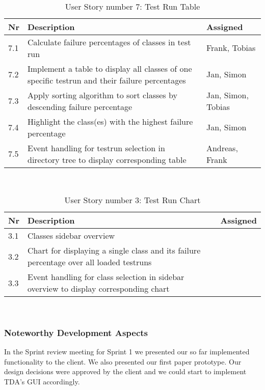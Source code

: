 \ \\ 

\begin{table}[h]
  \caption{User Story number 7: Test Run Table}
  \label{US_Table}
  \centering
  \begin{tabular}{p{1cm}|p{5cm}|p{3cm}|}
  	Nr & Description & Assigned \\ 
  	\hline
  	7.1 & Calculate failure percentages of classes in test run & Frank, Tobias \\ 
  	\hline
  	7.2 & Implement a table to display all classes of one specific testrun and their failure percentages & Jan, Simon \\ 
  	\hline
  	7.3 & Apply sorting algorithm to sort classes by descending failure percentage & Jan, Simon, Tobias \\
  	\hline
  	7.4 & Highlight the class(es) with the highest failure percentage & Jan, Simon \\
  	\hline
  	7.5 & Event handling for testrun selection in directory tree to display corresponding table & Andreas, Frank \\ 
  	\hline
  \end{tabular}
\end{table} 

\ \\ 

\begin{table}[h]
  \caption{User Story number 3: Test Run Chart}
  \label{US_Chart}
  \centering
  \begin{tabular}{p{1cm}|p{5cm}|p{3cm}|}
  	Nr & Description & Assigned \\ 
  	\hline
  	3.1 & Classes sidebar overview &  \\ 
  	\hline
  	3.2 & Chart for displaying a single class and its failure percentage over all loaded testruns &  \\ 
  	\hline
  	3.3 & Event handling for class selection in sidebar overview to display corresponding chart &  \\
  	\hline
  \end{tabular}
\end{table} 

\ \\ 

\subsubsection*{Noteworthy Development Aspects}

In the Sprint review meeting for Sprint 1 we presented our so far implemented functionality to the client. We also presented our first paper prototype. Our design decisions were approved by the client and we could start to implement TDA's GUI accordingly. \\ 

